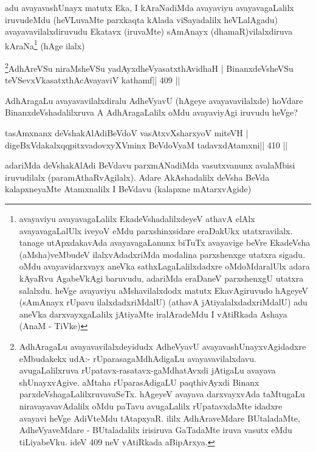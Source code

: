 \begin{artha}
adu avayavashUnayx matutx Eka, I kAraNadiMda avayaviyu avayavagaLalilx 
iruvudeMdu (heVLuvaMte parxkaqta kAlada viSayadalilx heVLalAgadu) 
avayavavilalxdiruvudu Ekatavx (iruvaMte) sAmAnayx (dhamaR)vilalxdiruva 
kAraNa\footnote{avayaviyu avayavagaLalilx EkadeVshadalilxdeyeV 
athavA elAlx avayavagaLalUlx iveyoV eMdu parxshinxsidare eraDakUkx 
utatxravilalx. tanage utApxdakavAda avayavagaLanunx biTuTx avayavige 
beVre EkadeVsha (aMsha)veMbudeV ilalxvAdadxriMda modalina parxshenxge 
utatxra sigadu. oMdu avayavidarxvayx aneVka sathxLagaLalilxdadxre oMdoMdaralUlx adara kAyaRvu AgabeVkAgi baruvudu, adariMda eraDaneV parxshenxgU utatxra salalxdu. heVge avayaviyu aMshavilalxdodx matutx EkavAgiruvudo hAgeyeV (sAmAnayx rUpavu ilalxdadxriMdalU) (athavA jAtiyalalxdadxriMdalU) adu aneVka darxvayxgaLalilx jAtiyaMte iralAradeMdu I vAtiRkada Ashaya (AnaM - TiVke)} (hAge ilalx) 
\end{artha}


\begin{shl}
\footnote{AdhAragaLu avayavavilalxdeyidudx AdheVyavU 
avayavashUnayxvAgidadxre eMbudakekx udA:- rUparasagaMdhAdigaLu 
avayavavilalxdavu. avugaLalilxruva rUpatavx-rasatavx-gaMdhatAvxdi 
jAtigaLu avayava shUnayxvAgive. aMtaha rUparasAdigaLU paqthivAyxdi 
Binanx parxdeVshagaLalilxruvavaSeTx. hAgeyeV avayava darxvayxvAda taMtugaLu niravayavavAdalilx oMdu paTavu avugaLalilx rUpatavxdaMte idadxre avayavi heVge AdiVteMdu tAtapxyaR. ililx AdhAraveMdare BUtaladaMte, AdheVyaveMdare - BUtaladalilx irisiruva GaTadaMte iruva vasutx eMdu tiLiyabeVku. ideV 409 neV vAtiRkada aBipArxya.}AdhAreVSu niraMsheVSu yadAyxdheVyasatxthAvidhaH |
BinanxdeVsheVSu teVSevxVkasatxthAcAvayaviV kathamf\hfill || 409 ||
\end{shl}

\begin{artha}
AdhAragaLu avayavavilalxdiralu AdheVyavU (hAgeye avayavavilalxde) hoVdare BinanxdeVshadalilxruva A AdhAragaLalilx oMdu avayaviyAgi iruvudu heVge?
\end{artha}

\begin{shl}
tasAmxnanx deVshakAlAdiBeVdoV vasAtxvXsharxyoV miteVH |
digeBxVdakalxqqpitxvadovxyXVminx BeVdoV\s yaM tadavxdAtamxni\hfill || 410 ||
\end{shl}

\begin{artha}
adariMda deVshakAlAdi BeVdavu parxmANadiMda vasutxvanunx avalaMbisi 
iruvudilalx (paramAthaRvAgilalx). Adare AkAshadalilx deVsha BeVda 
kalapxneyaMte Atamxnalilx I BeVdavu (kalapxne mAtarxvAgide)
\end{artha}

